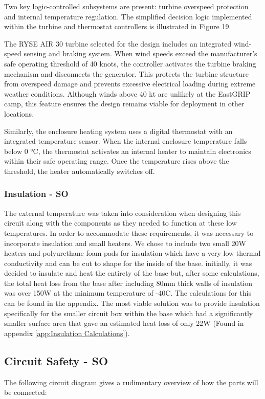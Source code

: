 \documentclass[11pt,a4paper]{article}
\begin{document}
Two key logic-controlled subsystems are present: turbine overspeed protection and internal temperature regulation. The simplified decision logic implemented within the turbine and thermostat controllers is illustrated in Figure 19.

The RYSE AIR 30 turbine selected for the design includes an integrated wind-speed sensing and braking system. When wind speeds exceed the manufacturer’s safe operating threshold of 40 knots, the controller activates the turbine braking mechanism and disconnects the generator. This protects the turbine structure from overspeed damage and prevents excessive electrical loading during extreme weather conditions. Although winds above 40 kt are unlikely at the EastGRIP camp, this feature ensures the design remains viable for deployment in other locations.

Similarly, the enclosure heating system uses a digital thermostat with an integrated temperature sensor. When the internal enclosure temperature falls below 0 °C, the thermostat activates an internal heater to maintain electronics within their safe operating range. Once the temperature rises above the threshold, the heater automatically switches off.


\subsubsection{Insulation - SO}
The external temperature was taken into consideration when designing this circuit along with the components as they needed to function at these low temperatures. In order to accommodate these requirements, it was necessary to incorporate insulation and small heaters. We chose to include two small 20W heaters and polyurethane foam pads for insulation which have a very low thermal conductivity and can be cut to shape for the inside of the base. initially, it was decided to insulate and heat the entirety of the base but, after some calculations, the total heat loss from the base after including 80mm thick walls of insulation was over 150W at the minimum temperature of -40C. The calculations for this can be found in the appendix. The most viable solution was to provide insulation specifically for the smaller circuit box within the base which had a significantly smaller surface area that gave an estimated heat loss of only 22W (Found in appendix \ref{app:Insulation Calculations}).


\subsection{Circuit Safety - SO}
The following circuit diagram gives a rudimentary overview of how the parts will be connected:
\end{document}
